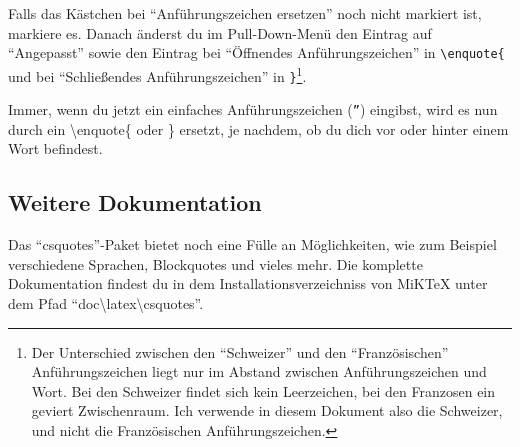 Falls das Kästchen bei \enquote{Anführungszeichen ersetzen} noch nicht markiert ist, markiere es. Danach änderst du im Pull-Down-Menü den Eintrag auf \enquote{Angepasst} sowie den Eintrag bei \enquote{Öffnendes Anführungszeichen} in \texttt{\textbackslash enquote\{} und bei \enquote{Schließendes Anführungszeichen} in \texttt{\}}\footnote{Der Unterschied zwischen den \enquote{Schweizer} und den \foreignquote{french}{Französischen} Anführungszeichen liegt nur im Abstand zwischen Anführungszeichen und Wort. Bei den Schweizer findet sich kein Leerzeichen, bei den Franzosen ein geviert Zwischenraum. Ich verwende in diesem Dokument also die Schweizer, und nicht die Französischen Anführungszeichen.}.

Immer, wenn du jetzt ein einfaches Anführungszeichen (\texttt{''}) eingibst, wird es nun durch ein \textbackslash enquote\{ oder \} ersetzt, je nachdem, ob du dich vor oder hinter einem Wort befindest.

\subsection{Weitere Dokumentation}

Das \enquote{csquotes}-Paket bietet noch eine Fülle an Möglichkeiten, wie zum Beispiel verschiedene Sprachen, Blockquotes und vieles mehr. Die komplette Dokumentation findest du in dem Installationsverzeichniss von MiKTeX unter dem Pfad \enquote{doc\textbackslash latex\textbackslash csquotes}.

